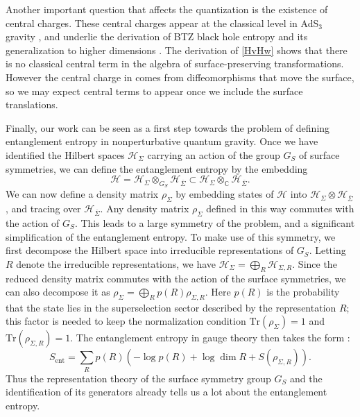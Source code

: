 \documentclass[a4paper,11pt]{article}
\newcommand{\Tr}{\mbox{Tr}}
\begin{document}
Another important question that affects the quantization is the existence of central charges.
These central charges appear at the classical level in AdS${}_3$ gravity \cite{Brown1986}, and underlie the derivation of BTZ black hole entropy \cite{Strominger:1997eq} and its generalization to higher dimensions \cite{Carlip1998}.
The derivation of \eqref{HvHw} shows that there is no classical central term in the algebra of surface-preserving transformations.
However the central charge in \cite{Carlip1998} comes from diffeomorphisms that move the surface, so we may expect central terms to appear once we include the surface translations.

Finally, our work can be seen as a first step towards the problem of defining entanglement entropy in nonperturbative quantum gravity.
Once we have identified the Hilbert spaces $\mathcal{H}_\Sigma$ carrying an action of the group $G_S$ of surface symmetries, we can define the entanglement entropy by the embedding
\begin{equation}
\mathcal{H} = \mathcal{H}_\Sigma \otimes_{G_S} \mathcal{H}_{\overline \Sigma} \subset \mathcal{H}_\Sigma \otimes_{\mathbb{C}} \mathcal{H}_{\overline \Sigma}.
\end{equation}
We can now define a density matrix $\rho_\Sigma$ by embedding states of $\mathcal{H}$ into $\mathcal{H}_\Sigma \otimes \mathcal{H}_{\overline \Sigma}$, and tracing over $\mathcal{H}_{\overline \Sigma}$.
Any density matrix $\rho_\Sigma$ defined in this way commutes with the action of $G_S$.
This leads to a large symmetry of the problem, and a significant simplification of the entanglement entropy.
To make use of this symmetry, we first decompose the Hilbert space into irreducible representations of $G_S$.
Letting $R$ denote the irreducible representations, we have $\mathcal{H}_\Sigma = \bigoplus_R \mathcal{H}_{\Sigma, R}$.
Since the reduced density matrix commutes with the action of the surface symmetries, we can also decompose it as $\rho_\Sigma = \bigoplus_R p(R) \rho_{\Sigma,R}$. 
Here $p(R)$ is the probability that the state lies in the superselection sector described by the representation $R$; this factor is needed to keep the normalization condition $\Tr(\rho_\Sigma) =1$ and $\Tr(\rho_{\Sigma,R}) = 1$.
The entanglement entropy in gauge theory then takes the form \cite{Donnelly2011}:
\begin{equation} \label{Sent}
S_\text{ent} = \sum_{R} p(R) \left(- \log p(R) + \log \dim R + S(\rho_{\Sigma,R}) \right).
\end{equation}
Thus the representation theory of the surface symmetry group $G_S$ and the identification of its generators already tells us a lot about the entanglement entropy.
\end{document}
